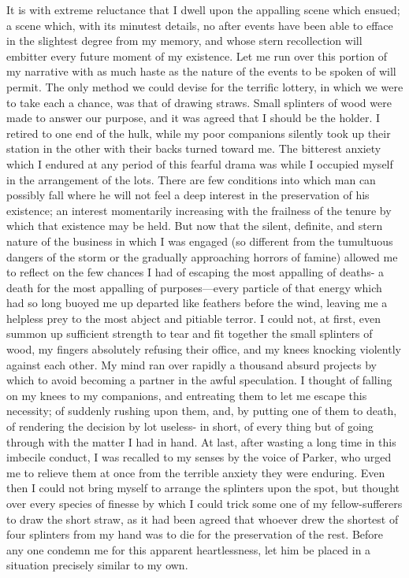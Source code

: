 It is with extreme reluctance that I dwell upon the appalling scene which
ensued; a scene which, with its minutest details, no after events have been able
to efface in the slightest degree from my memory, and whose stern recollection
will embitter every future moment of my existence. Let me run over this portion
of my narrative with as much haste as the nature of the events to be spoken of
will permit. The only method we could devise for the terrific lottery, in which
we were to take each a chance, was that of drawing straws. Small splinters of
wood were made to answer our purpose, and it was agreed that I should be the
holder. I retired to one end of the hulk, while my poor companions silently took
up their station in the other with their backs turned toward me. The bitterest
anxiety which I endured at any period of this fearful drama was while I occupied
myself in the arrangement of the lots. There are few conditions into which man
can possibly fall where he will not feel a deep interest in the preservation of
his existence; an interest momentarily increasing with the frailness of the
tenure by which that existence may be held. But now that the silent, definite,
and stern nature of the business in which I was engaged (so different from the
tumultuous dangers of the storm or the gradually approaching horrors of famine)
allowed me to reflect on the few chances I had of escaping the most appalling of
deaths- a death for the most appalling of purposes---every particle of that
energy which had so long buoyed me up departed like feathers before the wind,
leaving me a helpless prey to the most abject and pitiable terror. I could not,
at first, even summon up sufficient strength to tear and fit together the small
splinters of wood, my fingers absolutely refusing their office, and my knees
knocking violently against each other. My mind ran over rapidly a thousand
absurd projects by which to avoid becoming a partner in the awful speculation. I
thought of falling on my knees to my companions, and entreating them to let me
escape this necessity; of suddenly rushing upon them, and, by putting one of
them to death, of rendering the decision by lot useless- in short, of every
thing but of going through with the matter I had in hand. At last, after wasting
a long time in this imbecile conduct, I was recalled to my senses by the voice
of Parker, who urged me to relieve them at once from the terrible anxiety they
were enduring. Even then I could not bring myself to arrange the splinters upon
the spot, but thought over every species of finesse by which I could trick some
one of my fellow-sufferers to draw the short straw, as it had been agreed that
whoever drew the shortest of four splinters from my hand was to die for the
preservation of the rest. Before any one condemn me for this apparent
heartlessness, let him be placed in a situation precisely similar to my own. 

